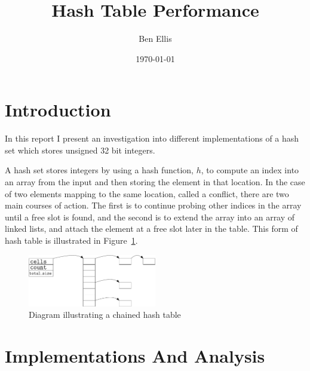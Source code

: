 \documentclass[12pt]{article}
\begin{document}
\title{Hash Table Performance}
\author{Ben Ellis}
\date{\today}
\maketitle

\section*{Introduction}
In this report I present an investigation into different implementations of
a hash set which stores unsigned 32 bit integers. 

A hash set stores integers by using a hash function, $h$, to compute an index
into an array from the input and then storing the element in that location. 
In the case of two elements mapping to the same location, called a conflict, there are two main
courses of action. The first is to continue probing other indices in the array until
a free slot is found, and the second is to extend the array into an array of linked lists, and
attach the element at a free slot later in the table. This form of hash table is illustrated in
Figure~\ref{fig:chaining}.

\begin{figure}
    \centering
    \includegraphics[width=0.5\textwidth]{chained_table}
    \caption{Diagram illustrating a chained hash table}\label{fig:chaining}
\end{figure}

\section*{Implementations And Analysis}
\end{document}
